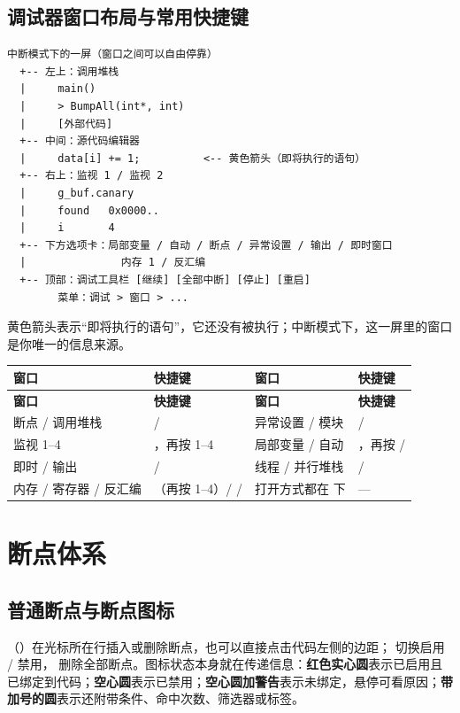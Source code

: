 \subsection{调试器窗口布局与常用快捷键}

\begin{lstlisting}[style=textstyle]
中断模式下的一屏（窗口之间可以自由停靠）
  +-- 左上：调用堆栈
  |     main()
  |     > BumpAll(int*, int)
  |     [外部代码]
  +-- 中间：源代码编辑器
  |     data[i] += 1;          <-- 黄色箭头（即将执行的语句）
  +-- 右上：监视 1 / 监视 2
  |     g_buf.canary
  |     found   0x0000..
  |     i       4
  +-- 下方选项卡：局部变量 / 自动 / 断点 / 异常设置 / 输出 / 即时窗口
  |               内存 1 / 反汇编
  +-- 顶部：调试工具栏 [继续] [全部中断] [停止] [重启]
        菜单：调试 > 窗口 > ...
\end{lstlisting}
黄色箭头表示“即将执行的语句”，它还没有被执行；中断模式下，这一屏里的窗口是你唯一的信息来源。

\begin{longtable}{L{2.6cm}L{4.4cm}L{2.6cm}L{4.6cm}}\toprule
\textbf{窗口} & \textbf{快捷键} & \textbf{窗口} & \textbf{快捷键} \\ \midrule \endfirsthead
\toprule \textbf{窗口} & \textbf{快捷键} & \textbf{窗口} & \textbf{快捷键} \\ \midrule \endhead \bottomrule \endlastfoot
断点 / 调用堆栈 &  /  & 异常设置 / 模块 &  /  \\
监视 1--4 & ，再按 1--4 & 局部变量 / 自动 & ，再按  /  \\
即时 / 输出 &  /  & 线程 / 并行堆栈 &  /  \\
内存 / 寄存器 / 反汇编 & （再按 1--4）/  /  & 打开方式都在  下 & — \\
\end{longtable}
\section{断点体系}

\subsection{普通断点与断点图标}

（）在光标所在行插入或删除断点，也可以直接点击代码左侧的边距； 切换启用 / 禁用， 删除全部断点。图标状态本身就在传递信息：\textbf{红色实心圆}表示已启用且已绑定到代码；\textbf{空心圆}表示已禁用；\textbf{空心圆加警告}表示未绑定，悬停可看原因；\textbf{带加号的圆}表示还附带条件、命中次数、筛选器或标签。

